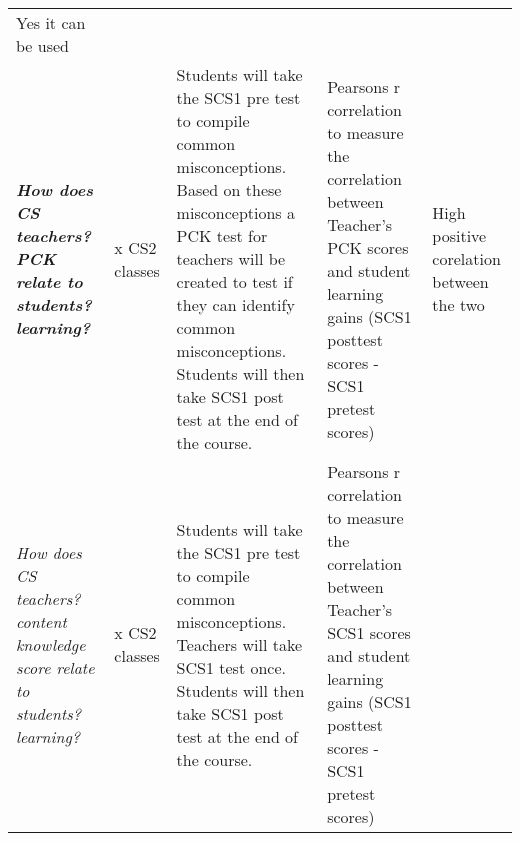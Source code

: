 \begin{landscape}
\begin{longtable}[]{@{}p{100pt} p{40pt}p{160pt} p{160pt} p{40pt} @{}}
\begin{minipage}[t]{0.07\columnwidth}
	Yes it can be used\strut
	\end{minipage}\tabularnewline
	\begin{minipage}[t]{0.12\columnwidth}\raggedright\strut
	\textbf{\emph{How does CS teachers? PCK relate to students?
	learning?}}\strut
	\end{minipage} & \begin{minipage}[t]{0.02\columnwidth}\raggedright\strut
	x CS2 classes\strut
	\end{minipage} & \begin{minipage}[t]{0.34\columnwidth}\raggedright\strut
	Students will take the SCS1 pre test to compile common misconceptions.
	Based on these misconceptions a PCK test for teachers will be created to
	test if they can identify common misconceptions. Students will then take
	SCS1 post test at the end of the course.\strut
	\end{minipage} & \begin{minipage}[t]{0.30\columnwidth}\raggedright\strut
	Pearsons r correlation to measure the correlation between Teacher's PCK
	scores and student learning gains (SCS1 posttest scores - SCS1 pretest
	scores)\strut
	\end{minipage} & \begin{minipage}[t]{0.07\columnwidth}\raggedright\strut
	High positive corelation between the two\strut
	\end{minipage}\tabularnewline
	\begin{minipage}[t]{0.12\columnwidth}\raggedright\strut
	\emph{How does CS teachers? content knowledge score relate to students?
	learning?}\strut
	\end{minipage} & \begin{minipage}[t]{0.02\columnwidth}\raggedright\strut
	x CS2 classes\strut
	\end{minipage} & \begin{minipage}[t]{0.34\columnwidth}\raggedright\strut
	Students will take the SCS1 pre test to compile common misconceptions.
	Teachers will take SCS1 test once. Students will then take SCS1 post
	test at the end of the course.\strut
	\end{minipage} & \begin{minipage}[t]{0.30\columnwidth}\raggedright\strut
	Pearsons r correlation to measure the correlation between Teacher's SCS1
	scores and student learning gains (SCS1 posttest scores - SCS1 pretest
	scores)\strut
	\end{minipage} & \begin{minipage}[t]{0.07\columnwidth}\raggedright\strut

\end{minipage}
\end{longtable}
\end{landscape}
